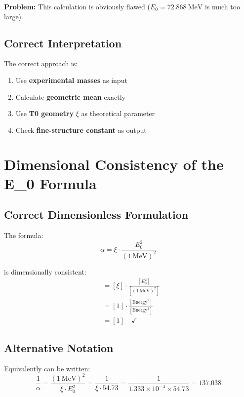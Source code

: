 \documentclass[12pt,a4paper]{article}
\theoremstyle{definition}
\begin{document}
	\textbf{Problem:} This calculation is obviously flawed ($E_0 = \SI{72.868}{\MeV}$ is much too large).
	
	\subsection{Correct Interpretation}
	
	The correct approach is:
	\begin{enumerate}
		\item Use \textbf{experimental masses} as input
		\item Calculate \textbf{geometric mean} exactly  
		\item Use \textbf{T0 geometry} $\xi$ as theoretical parameter
		\item Check \textbf{fine-structure constant} as output
	\end{enumerate}
	
	\section{Dimensional Consistency of the E\_0 Formula}
	
	\subsection{Correct Dimensionless Formulation}
	
	The formula:
	\begin{equation}
		\alpha = \xi \cdot \frac{E_0^2}{( \SI{1}{\MeV} )^2}
	\end{equation}
	
	is dimensionally consistent:
	\begin{align}
		[\alpha] &= [\xi] \cdot \frac{[E_0^2]}{[( \SI{1}{\MeV} )^2]} \\
		&= [1] \cdot \frac{[\text{Energy}^2]}{[\text{Energy}^2]} \\
		&= [1] \quad \checkmark
	\end{align}
	
	\subsection{Alternative Notation}
	
	Equivalently can be written:
	\begin{equation}
		\frac{1}{\alpha} = \frac{( \SI{1}{\MeV} )^2}{\xi \cdot E_0^2} = \frac{1}{\xi \cdot 54.73} = \frac{1}{1.333 \times 10^{-4} \times 54.73} = 137.038
	\end{equation}
	
\end{document}

